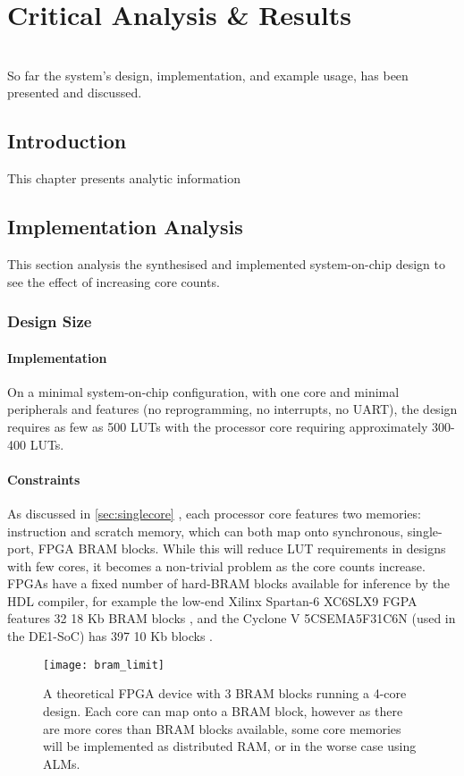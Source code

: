 \chapter{Critical Analysis \& Results}
\startcontents[chapters]
\noindent\\
So far the system's design, implementation, and example usage, has been presented and discussed.

\section{Introduction}
This chapter presents analytic information

\section{Implementation Analysis}
This section analysis the synthesised and implemented system-on-chip design to see the effect of increasing core counts.

\subsection{Design Size}
\subsubsection{Implementation}
On a minimal system-on-chip configuration, with one core and minimal peripherals and features (no reprogramming, no interrupts, no UART), the design requires as few as 500 LUTs with the processor core requiring approximately 300-400 LUTs.

\subsubsection{Constraints}
As discussed in \cref{sec:singlecore} , each processor core features two memories: instruction and scratch memory, which can both map onto synchronous, single-port, FPGA BRAM blocks. While this will reduce LUT requirements in designs with few cores, it becomes a non-trivial problem as the core counts increase. FPGAs have a fixed number of hard-BRAM blocks available for inference by the HDL compiler, for example the low-end Xilinx Spartan-6 XC6SLX9 FGPA features 32 18 Kb BRAM blocks \cite[p.~2]{s6fam}, and the Cyclone V 5CSEMA5F31C6N (used in the DE1-SoC) has 397 10 Kb blocks \cite[p.~22]{cvfam}.

\begin{figure}[h]
\centering
\texttt{[image: bram\_limit]}
\caption{A theoretical FPGA device with 3 BRAM blocks running a 4-core design. Each core can map onto a BRAM block, however as there are more cores than BRAM blocks available, some core memories will be implemented as distributed RAM, or in the worse case using ALMs.}
\label{fig:bram_limit}
\end{figure}

